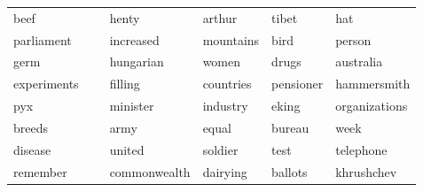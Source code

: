 \documentclass{beamer}       %
\begin{document}
\begin{frame}
\begin{table}[h!]
\begin{tabular}{llllll}
\cellcolor{red!25}beef        & ~            & henty        & arthur     & \cellcolor{blue!25}tibet         & hat           \\
\cellcolor{gray!25}parliament  & ~            & increased    & \cellcolor{red!25}mountains  & \cellcolor{red!25}bird          & person        \\
\cellcolor{yellow!25}germ        & ~            & \cellcolor{blue!25}hungarian    & women      & \cellcolor{yellow!25}drugs         & australia     \\
\cellcolor{yellow!25}experiments & ~            & filling      & countries  & pensioner     & hammersmith   \\
pyx         & ~            & \cellcolor{gray!25}minister     & \cellcolor{red!25}industry   & eking         & organizations \\
\cellcolor{red!25}breeds      & ~            & \cellcolor{green!25}army     & equal      & bureau        & week          \\
\cellcolor{yellow!25}disease     & ~            & united       & \cellcolor{green!25}soldier    & test          & telephone     \\
remember    & ~            & commonwealth & \cellcolor{red!25}dairying   & \cellcolor{gray!25}ballots       & \cellcolor{blue!25}khrushchev    \\
\bottomrule
\end{tabular}
\end{table}
\end{frame}
\end{document}
